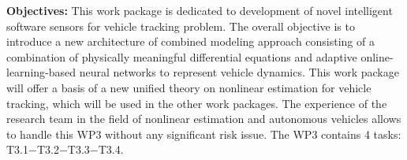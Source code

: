 \documentclass[a4paper,11pt]{article}
\begin{document}
\begin{itemize}[leftmargin=.2in,noitemsep,nolistsep]
\begin{tcolorbox}[breakable, enhanced,  colback=blue!2!white,
title = \bf Contributors$-$Deadlines$-$Objectives, coltitle= black, colbacktitle=purple!40!white, halign title=center]
{ \bf {Objectives}:} This work package is dedicated to development of novel intelligent software sensors for vehicle tracking problem. The overall objective is to introduce a new architecture of combined modeling approach consisting of a combination of physically meaningful differential equations and adaptive online-learning-based neural networks to represent vehicle dynamics. This work package will offer a basis of a new unified theory on nonlinear estimation for vehicle tracking, which will be used in the other work packages. The experience of the research team in the field of nonlinear estimation and autonomous vehicles allows to handle this WP3 without any significant risk issue. The WP3 contains 4 tasks: T3.1$-$T3.2$-$T3.3$-$T3.4.

\end{tcolorbox}

\end{itemize}
\end{document}
